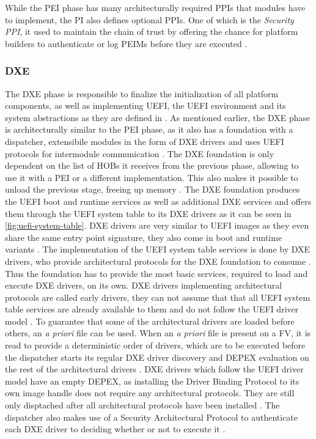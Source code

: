 While the \ac{PEI} phase has many architecturally required \acp{PPI} that modules have to implement, the \ac{PI} also defines optional \acp{PPI}.
One of which is the \emph{Security PPI}, it used to maintain the chain of trust by offering the chance for platform builders to authenticate or log \acp{PEIM} before they are executed \cite[Vol. 1, 6.3.6]{pi-spec}.


\subsubsection{\acf{DXE}}

The \ac{DXE} phase is responsible to finalize the initialization of all platform components, as well as implementing \ac{UEFI}, the \ac{UEFI} environment and its system abstractions as they are defined in \cite{uefi-spec}.
As mentioned earlier, the \ac{DXE} phase is architecturally similar to the \ac{PEI} phase, as it also has a foundation with a dispatcher, extensibile modules in the form of \ac{DXE} drivers and uses \ac{UEFI} protocols for intermodule communication \citep[Vol. 2, 2.1]{pi-spec}.
The \ac{DXE} foundation is only dependent on the list of \acp{HOB} it receives from the previous phase, allowing to use it with a \ac{PEI} or a different implementation.
This also makes it possible to unload the previous stage, freeing up memory \cite[Vol. 2, 9.1]{pi-spec}.
The \ac{DXE} foundation produces the \ac{UEFI} boot and runtime services as well as additional \ac{DXE} services and offers them through the \ac{UEFI} system table to its \ac{DXE} drivers as it can be seen in \autoref{fig:uefi-system-table}\cite[Vol. 2, 2.2.1]{pi-spec}.
\ac{DXE} drivers are very similar to \ac{UEFI} images as they even share the same entry point signature, they also come in boot and runtime variants \cite[Vol. 2, 11.2.3]{pi-spec}.
The implementation of the \ac{UEFI} system table services is done by \ac{DXE} drivers, who provide architectural protocols for the \ac{DXE} foundation to consume \cite[Vol. 2, 12.1]{pi-spec}.
Thus the foundation has to provide the most basic services, required to load and execute \ac{DXE} drivers, on its own.
\ac{DXE} drivers implementing architectural protocols are called early drivers, they can not assume that that all \ac{UEFI} system table services are already available to them and do not follow the \ac{UEFI} driver model \cite[Vol. 2, 11.2.1]{pi-spec}.
To guarantee that some of the architectural drivers are loaded before others, an \emph{a priori} file can be used.
When an \emph{a priori} file is present on a \ac{FV}, it is read to provide a deterministic order of drivers, which are to be executed before the dispatcher starts its regular \ac{DXE} driver discovery and \ac{DEPEX} evaluation on the rest of the architectural drivers \cite[Vol. 2, 10.3]{pi-spec}.
\ac{DXE} drivers which follow the \ac{UEFI} driver model have an empty \ac{DEPEX}, as installing the Driver Binding Protocol to its own image handle does not require any architectural protocols.
They are still only disptached after all architectural protocols have been installed \cite[Vol. 2, 11.2.2]{pi-spec}.
The dispatcher also makes use of a Security Architectural Protocol to authenticate each \ac{DXE} driver to deciding whether or not to execute it \cite[Vol. 2, 10.13]{pi-spec}.

